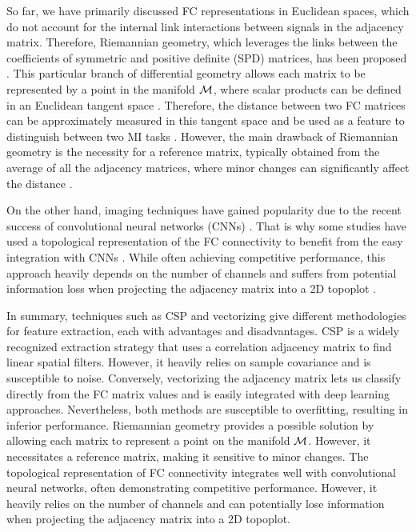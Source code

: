 So far, we have primarily discussed FC representations in Euclidean spaces, which do not account for the internal link interactions between signals in the adjacency matrix. Therefore, Riemannian geometry, which leverages the links between the coefficients of symmetric and positive definite (SPD) matrices, has been proposed \cite{freer2019adaptive}. This particular branch of differential geometry allows each matrix to be represented by a point in the manifold $\cal{M}$, where scalar products can be defined in an Euclidean tangent space \cite{mishra2018novel}. Therefore, the distance between two FC matrices can be approximately measured in this tangent space and be used as a feature to distinguish between two MI tasks \cite{ding2023study}. However, the main drawback of Riemannian geometry is the necessity for a reference matrix, typically obtained from the average of all the adjacency matrices, where minor changes can significantly affect the distance \cite{miah2020motor}.

On the other hand, imaging techniques have gained popularity due to the recent success of convolutional neural networks (CNNs) \cite{xu2020learning}. That is why some studies have used a topological representation of the FC connectivity to benefit from the easy integration with CNNs \cite{collazos2021deep}. While often achieving competitive performance, this approach heavily depends on the number of channels and suffers from potential information loss when projecting the adjacency matrix into a 2D topoplot \cite{zhao2019multi,altaheri2023deep}.

In summary, techniques such as CSP and vectorizing give different methodologies for feature extraction, each with advantages and disadvantages. CSP is a widely recognized extraction strategy that uses a correlation adjacency matrix to find linear spatial filters. However, it heavily relies on sample covariance and is susceptible to noise. Conversely, vectorizing the adjacency matrix lets us classify directly from the FC matrix values and is easily integrated with deep learning approaches. Nevertheless, both methods are susceptible to overfitting, resulting in inferior performance. Riemannian geometry provides a possible solution by allowing each matrix to represent a point on the manifold $\cal{M}$. However, it necessitates a reference matrix, making it sensitive to minor changes. The topological representation of FC connectivity integrates well with convolutional neural networks, often demonstrating competitive performance. However, it heavily relies on the number of channels and can potentially lose information when projecting the adjacency matrix into a 2D topoplot. 


